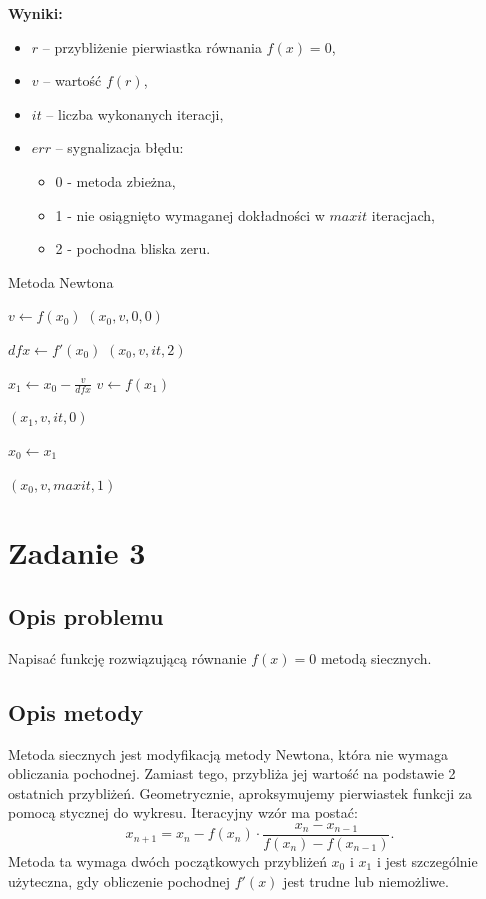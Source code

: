\documentclass{article}
\begin{document}
\noindent \textbf{Wyniki:}
\begin{itemize}
  \item \( r \) – przybliżenie pierwiastka równania \( f(x) = 0 \),
  \item \( v \) – wartość \( f(r) \),
  \item \( it \) – liczba wykonanych iteracji,
  \item \( err \) – sygnalizacja błędu:
  \begin{itemize}
    \item 0 - metoda zbieżna,
    \item 1 - nie osiągnięto wymaganej dokładności w \( maxit \) iteracjach,
    \item 2 - pochodna bliska zeru.
  \end{itemize}
\end{itemize}

\begin{algorithm}[H]
\caption{Metoda Newtona}
\begin{algorithmic}[1]

\STATE $v \gets f(x_0)$
    \RETURN $(x_0, v, 0, 0)$
\ENDIF

    \STATE $dfx \gets f'(x_0)$
        \RETURN $(x_0, v, it, 2)$
    \ENDIF

    \STATE $x_1 \gets x_0 - \frac{v}{dfx}$
    \STATE $v \gets f(x_1)$

        \RETURN $(x_1, v, it, 0)$
    \ENDIF

    \STATE $x_0 \gets x_1$
\ENDFOR

\RETURN $(x_0, v, maxit, 1)$
\end{algorithmic}
\end{algorithm}


\section{Zadanie 3}
\subsection{Opis problemu}
Napisać funkcję rozwiązującą równanie \( f(x) = 0 \) metodą siecznych.

\subsection{Opis metody}
Metoda siecznych jest modyfikacją metody Newtona, która nie wymaga obliczania pochodnej. Zamiast tego, przybliża jej wartość na podstawie 2 ostatnich przybliżeń.
Geometrycznie, aproksymujemy pierwiastek funkcji za pomocą stycznej do wykresu. Iteracyjny wzór ma postać:
\[
x_{n+1} = x_n - f(x_n) \cdot \frac{x_n - x_{n-1}}{f(x_n) - f(x_{n-1})}.
\]
Metoda ta wymaga dwóch początkowych przybliżeń \( x_0 \) i \( x_1 \) i jest szczególnie użyteczna, gdy obliczenie pochodnej \( f'(x) \) jest trudne lub niemożliwe.
\end{document}
